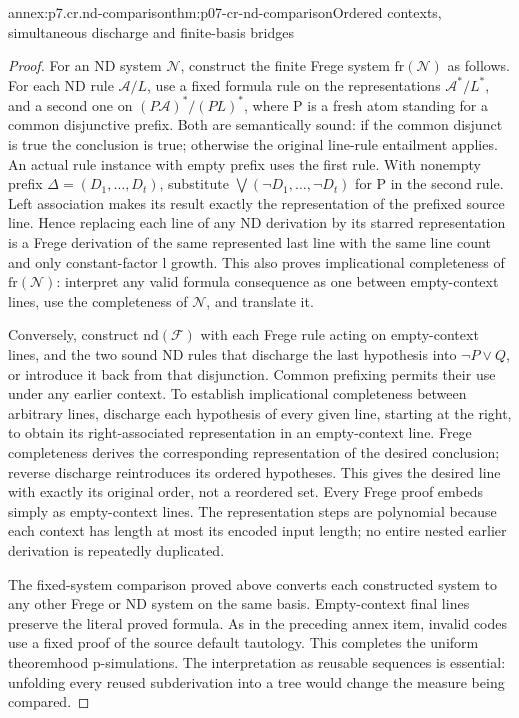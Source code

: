 \begin{annexitem}{annex:p7.cr.nd-comparison}{thm:p07-cr-nd-comparison}{Ordered contexts, simultaneous discharge and finite-basis bridges}
\begin{proof}
For an ND system \(\mathcal N\), construct the finite Frege
system \(\mathrm{fr}(\mathcal N)\) as follows. For each ND
rule \(\mathcal A/L\), use a fixed formula rule on the
representations \(\mathcal A^*/L^*\), and a second one on
\((P\mathcal A)^*/(PL)^*\), where P is a fresh atom
standing for a common disjunctive prefix. Both are semantically
sound: if the common disjunct is true the conclusion is true;
otherwise the original line-rule entailment applies. An actual
rule instance with empty prefix uses the first rule. With nonempty
prefix \(\Delta=(D_1,\ldots,D_t)\), substitute
\(\bigvee(\neg D_1,\ldots,\neg D_t)\) for P in the
second rule. Left association makes its result exactly the
representation of the prefixed source line. Hence replacing
each line of any ND derivation by its starred representation
is a Frege derivation of the same represented last line with
the same line count and only constant-factor l growth. This
also proves implicational completeness of \(\mathrm{fr}(\mathcal N)\):
interpret any valid formula consequence as one between empty-context
lines, use the completeness of \(\mathcal N\), and translate it.

Conversely, construct \(\mathrm{nd}(\mathcal F)\) with each
Frege rule acting on empty-context lines, and the two sound
ND rules that discharge the last hypothesis into
\(\neg P\lor Q\), or introduce it back from that disjunction.
Common prefixing permits their use under any earlier context.
To establish implicational completeness between arbitrary lines,
discharge each hypothesis of every given line, starting at the
right, to obtain its right-associated representation in an
empty-context line. Frege completeness derives the corresponding
representation of the desired conclusion; reverse discharge
reintroduces its ordered hypotheses. This gives the desired
line with exactly its original order, not a reordered set.
Every Frege proof embeds simply as empty-context lines.
The representation steps are polynomial because each context has
length at most its encoded input length; no entire nested earlier
derivation is repeatedly duplicated.

The fixed-system comparison proved above converts each constructed
system to any other Frege or ND system on the same basis.
Empty-context final lines preserve the literal proved formula.
As in the preceding annex item, invalid codes use a fixed proof
of the source default tautology. This completes the uniform
theoremhood p-simulations. The interpretation as reusable sequences
is essential: unfolding every reused subderivation into a tree
would change the measure being compared.
\end{proof}
\end{annexitem}


